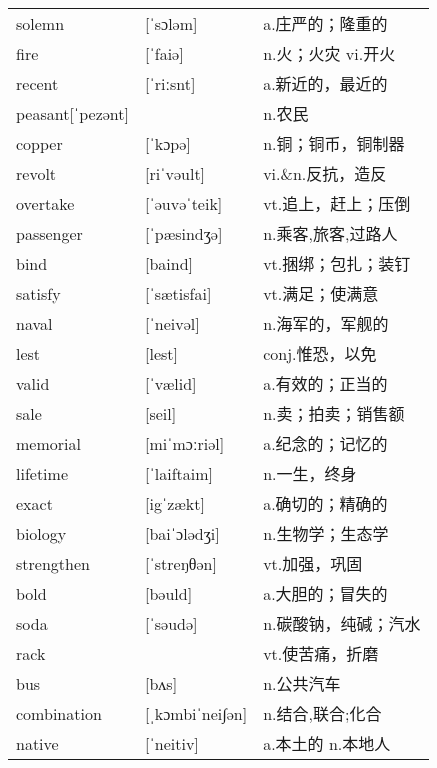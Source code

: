 \documentclass[a4paper]{article}
\begin{document}
\section{}
\begin{tabular}{l l l}

solemn & [ˈsɔləm] & a.庄严的；隆重的 \\
fire & [ˈfaiə] & n.火；火灾 vi.开火 \\
recent & [ˈriːsnt] & a.新近的，最近的 \\
peasant[ˈpezənt] &  & n.农民 \\
copper & [ˈkɔpə] & n.铜；铜币，铜制器 \\
revolt & [riˈvəult] & vi.\&n.反抗，造反 \\
overtake & [ˈəuvəˈteik] & vt.追上，赶上；压倒 \\
passenger & [ˈpæsindʒə] & n.乘客,旅客,过路人 \\
bind & [baind] & vt.捆绑；包扎；装钉 \\
satisfy & [ˈsætisfai] & vt.满足；使满意 \\
naval & [ˈneivəl] & n.海军的，军舰的 \\
lest & [lest] & conj.惟恐，以免 \\
valid & [ˈvælid] & a.有效的；正当的 \\
sale & [seil] & n.卖；拍卖；销售额 \\
memorial & [miˈmɔːriəl] & a.纪念的；记忆的 \\
lifetime & [ˈlaiftaim] & n.一生，终身 \\
exact & [igˈzækt] & a.确切的；精确的 \\
biology & [baiˈɔlədʒi] & n.生物学；生态学 \\
strengthen & [ˈstreŋθən] & vt.加强，巩固 \\
bold & [bəuld] & a.大胆的；冒失的 \\
soda & [ˈsəudə] & n.碳酸钠，纯碱；汽水 \\
rack &  & vt.使苦痛，折磨 \\
bus & [bʌs] & n.公共汽车 \\
combination & [ˌkɔmbiˈnei∫ən] & n.结合,联合;化合 \\
native & [ˈneitiv] & a.本土的 n.本地人 \\

\end{tabular}
\end{document}

